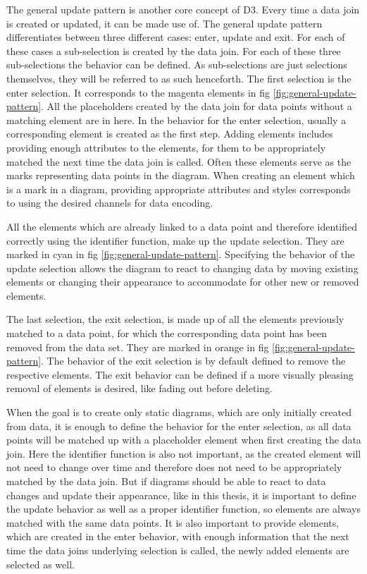 The general update pattern is another core concept of D3. Every time a data join is created or updated, it can be made use of. The general update pattern differentiates between three different cases: enter, update and exit. For each of these cases a sub-selection is created by the data join. For each of these three sub-selections the behavior can be defined. As sub-selections are just selections themselves, they will be referred to as such henceforth. The first selection is the enter selection. It corresponds to the magenta elements in fig \ref{fig:general-update-pattern}. All the placeholders created by the data join for data points without a matching element are in here. In the behavior for the enter selection, usually a corresponding element is created as the first step. Adding elements includes providing enough attributes to the elements, for them to be appropriately matched the next time the data join is called. Often these elements serve as the marks representing data points in the diagram. When creating an element which is a mark in a diagram, providing appropriate attributes and styles corresponds to using the desired channels for data encoding.

All the elements which are already linked to a data point and therefore identified correctly using the identifier function, make up the update selection. They are marked in cyan in fig \ref{fig:general-update-pattern}. Specifying the behavior of the update selection allows the diagram to react to changing data by moving existing elements or changing their appearance to accommodate for other new or removed elements.

The last selection, the exit selection, is made up of all the elements previously matched to a data point, for which the corresponding data point has been removed from the data set. They are marked in orange in fig \ref{fig:general-update-pattern}. The behavior of the exit selection is by default defined to remove the respective elements. The exit behavior can be defined if a more visually pleasing removal of elements is desired, like fading out before deleting.

When the goal is to create only static diagrams, which are only initially created from data, it is enough to define the behavior for the enter selection, as all data points will be matched up with a placeholder element when first creating the data join. Here the identifier function is also not important, as the created element will not need to change over time and therefore does not need to be appropriately matched by the data join. But if diagrams should be able to react to data changes and update their appearance, like in this thesis, it is important to define the update behavior as well as a proper identifier function, so elements are always matched with the same data points. It is also important to provide elements, which are created in the enter behavior, with enough information that the next time the data joins underlying selection is called, the newly added elements are selected as well.


